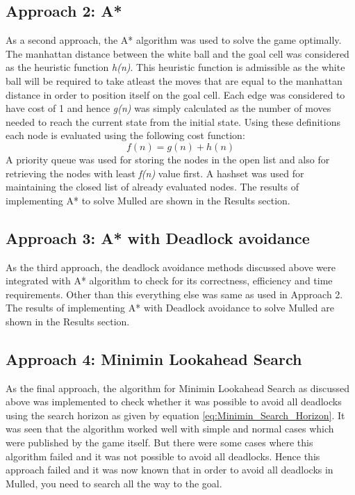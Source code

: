 \documentclass[letterpaper]{article}
\begin{document}
\subsection{Approach 2: A*}
As a second approach, the A* algorithm was used to solve the game optimally. The manhattan distance between the white ball and the goal cell was considered as the heuristic function \emph{h(n)}. This heuristic function is admissible as the white ball will be required to take atleast the moves that are equal to the manhattan distance in order to position itself on the goal cell. Each edge was considered to have cost of 1 and hence \emph{g(n)} was simply calculated as the number of moves needed to reach the current state from the initial state. Using these definitions each node is evaluated using the following cost function:
\begin{equation}
f(n) = g(n) + h(n)
\end{equation} 
A priority queue was used for storing the nodes in the open list and also for retrieving the nodes with least \emph{f(n)} value first. A hashset was used for maintaining the closed list of already evaluated nodes. The results of implementing A* to solve Mulled are shown in the Results section.

\subsection{Approach 3: A* with Deadlock avoidance}
As the third approach, the deadlock avoidance methods discussed above were integrated with A* algorithm to check for its correctness, efficiency and time requirements. Other than this everything else was same as used in Approach 2. The results of implementing A* with Deadlock avoidance to solve Mulled are shown in the Results section.

\subsection{Approach 4: Minimin Lookahead Search}
As the final approach, the algorithm for Minimin Lookahead Search as discussed above was implemented to check whether it was possible to avoid all deadlocks using the search horizon as given by equation \ref{eq:Minimin_Search_Horizon}. It was seen that the algorithm worked well with simple and normal cases which were published by the game itself. But there were some cases where this algorithm failed and it was not possible to  avoid all deadlocks. Hence this approach failed and it was now known that in order to avoid all deadlocks in Mulled, you need to search all the way to the goal. 
\end{document}
